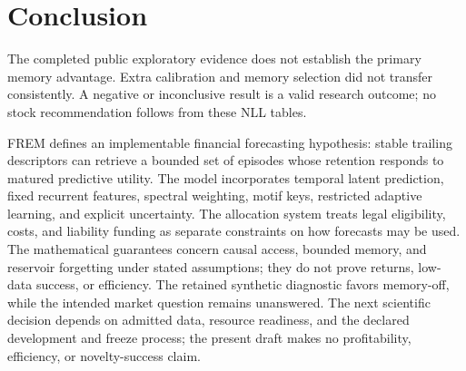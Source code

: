 \documentclass[11pt,a4paper]{article}
\begin{document}
\section{Conclusion}
The completed public exploratory evidence does not establish the primary memory advantage. Extra calibration and memory selection did not transfer consistently. A negative or inconclusive result is a valid research outcome; no stock recommendation follows from these NLL tables.


FREM defines an implementable financial forecasting hypothesis: stable trailing descriptors can retrieve a bounded set of episodes whose retention responds to matured predictive utility. The model incorporates temporal latent prediction, fixed recurrent features, spectral weighting, motif keys, restricted adaptive learning, and explicit uncertainty. The allocation system treats legal eligibility, costs, and liability funding as separate constraints on how forecasts may be used. The mathematical guarantees concern causal access, bounded memory, and reservoir forgetting under stated assumptions; they do not prove returns, low-data success, or efficiency. The retained synthetic diagnostic favors memory-off, while the intended market question remains unanswered. The next scientific decision depends on admitted data, resource readiness, and the declared development and freeze process; the present draft makes no profitability, efficiency, or novelty-success claim.

\appendix
\end{document}
